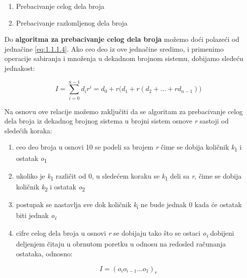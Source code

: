 \documentclass[a4paper,11pt]{article}
\numberwithin{equation}{section}
\begin{document}
\begin{enumerate}[label=\Roman*.,start=1,leftmargin=*]
\item Prebacivanje celog dela broja

\item Prebacivanje razlomljenog dela broja

\end{enumerate}


Do \textbf{algoritma za prebacivanje celog dela broja} možemo doći polazeći od jednačine \eqref{eq:1.1.1.4}. Ako ceo deo iz ove jednačine sredimo, i primenimo operacije sabiranja i množenja u dekadnom brojnom sistemu, dobijamo sledeću jednakost:



\begin{equation}\label{eq:1.1.1.5}
I=\sum_{i=0}^{n-1}d_i r^i=d_0+r\bigl(d_1+r(d_2+\dots+r d_{n-1})\bigr)
\end{equation}


Na osnovu ove relacije možemo zaključiti da se algoritam za prebacivanje celog dela broja iz dekadnog brojnog sistema u brojni sistem osnove \emph{r} sastoji od sledećih koraka:



\begin{enumerate}[label=\arabic*),start=1,leftmargin=*]
\item ceo deo broja u osnovi 10 se podeli sa brojem \emph{r} čime se dobija količnik \emph{k}\textsubscript{1} i ostatak \emph{o}\textsubscript{1}

\item ukoliko je \emph{k}\textsubscript{1} različit od 0, u sledećem koraku se \emph{k}\textsubscript{1} deli sa \emph{r}, čime se dobija količnik \emph{k}\textsubscript{2} i ostatak \emph{o}\textsubscript{2}

\item postupak se nastavlja sve dok količnik \emph{k}\textsubscript{i} ne bude jednak 0 kada će ostatak biti jednak \emph{o\textsubscript{i}}

\item cifre celog dela broja u osnovi \emph{r} se dobijaju tako što se ostaci \emph{o\textsubscript{i}} dobijeni deljenjem čitaju u obrnutom poretku u odnosu na redosled računanja ostataka, odnosno:

\end{enumerate}


\begin{equation}\label{eq:1.1.1.6}
I=(o_i o_{i-1}\dots o_1)_r
\end{equation}
\end{document}
